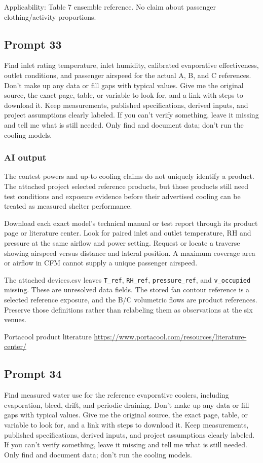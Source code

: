 Applicability: Table 7 ensemble reference. No claim about passenger clothing/activity proportions.

\subsection*{Prompt 33}
Find inlet rating temperature, inlet humidity, calibrated evaporative effectiveness, outlet conditions, and passenger airspeed for the actual A, B, and C references. Don’t make up any data or fill gaps with typical values. Give me the original source, the exact page, table, or variable to look for, and a link with steps to download it. Keep measurements, published specifications, derived inputs, and project assumptions clearly labeled. If you can’t verify something, leave it missing and tell me what is still needed. Only find and document data; don’t run the cooling models.

\subsubsection*{AI output}
The contest powers and up-to cooling claims do not uniquely identify a product. The attached project selected reference products, but those products still need test conditions and exposure evidence before their advertised cooling can be treated as measured shelter performance.

Download each exact model’s technical manual or test report through its product page or literature center. Look for paired inlet and outlet temperature, RH and pressure at the same airflow and power setting. Request or locate a traverse showing airspeed versus distance and lateral position. A maximum coverage area or airflow in CFM cannot supply a unique passenger airspeed.

The attached devices.csv leaves \nolinkurl{T_ref}, \nolinkurl{RH_ref}, \nolinkurl{pressure_ref}, and \nolinkurl{v_occupied} missing. These are unresolved data fields. The stored fan contour reference is a selected reference exposure, and the B/C volumetric flows are product references. Preserve those definitions rather than relabeling them as observations at the six venues.

Portacool product literature  \url{https://www.portacool.com/resources/literature-center/}

\subsection*{Prompt 34}
Find measured water use for the reference evaporative coolers, including evaporation, bleed, drift, and periodic draining. Don’t make up any data or fill gaps with typical values. Give me the original source, the exact page, table, or variable to look for, and a link with steps to download it. Keep measurements, published specifications, derived inputs, and project assumptions clearly labeled. If you can’t verify something, leave it missing and tell me what is still needed. Only find and document data; don’t run the cooling models.

